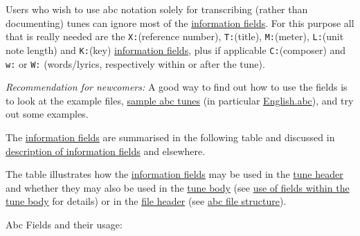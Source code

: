 \documentclass[oneside]{book}
\begin{document}
Users who wish to use abc notation solely for transcribing (rather than
documenting) tunes can ignore most of the
\protect\hyperlink{information_field_definition}{information fields}.
For this purpose all that is really needed are the \texttt{X:}(reference
number), \texttt{T:}(title), \texttt{M:}(meter), \texttt{L:}(unit note
length) and \texttt{K:}(key)
\protect\hyperlink{information_field_definition}{information fields},
plus if applicable \texttt{C:}(composer) and \texttt{w:} or \texttt{W:}
(words/lyrics, respectively within or after the tune).

\emph{Recommendation for newcomers:} A good way to find out how to use
the fields is to look at the example files,
\protect\hyperlink{sample_abc_tunes}{sample abc tunes} (in particular
\protect\hyperlink{englishabc}{English.abc}), and try out some examples.

The \protect\hyperlink{information_field_definition}{information fields}
are summarised in the following table and discussed in
\protect\hyperlink{description_of_information_fields}{description of
information fields} and elsewhere.

The table illustrates how the
\protect\hyperlink{information_field_definition}{information fields} may
be used in the \protect\hyperlink{tune_header_definition}{tune header}
and whether they may also be used in the
\protect\hyperlink{tune_body_definition}{tune body} (see
\protect\hyperlink{use_of_fields_within_the_tune_body}{use of fields
within the tune body} for details) or in the
\protect\hyperlink{file_header_definition}{file header} (see
\protect\hyperlink{abc_file_structure}{abc file structure}).

Abc Fields and their usage:
\end{document}
